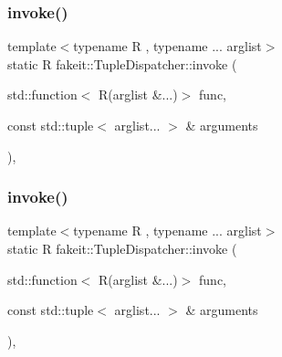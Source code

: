 \subsubsection{\texorpdfstring{invoke()}{invoke()}\hspace{0.1cm}{\footnotesize\ttfamily [7/9]}}
{\footnotesize\ttfamily template$<$typename R , typename ... arglist$>$ \\
static R fakeit\+::\+Tuple\+Dispatcher\+::invoke (\begin{DoxyParamCaption}\item[{std\+::function$<$ R(arglist \&...)$>$}]{func,  }\item[{const std\+::tuple$<$ arglist... $>$ \&}]{arguments }\end{DoxyParamCaption})\hspace{0.3cm}{\ttfamily [inline]}, {\ttfamily [static]}}

\mbox{\label{structfakeit_1_1TupleDispatcher_a279619fd6d6649c4d99c459a3286469a}} 
\subsubsection{\texorpdfstring{invoke()}{invoke()}\hspace{0.1cm}{\footnotesize\ttfamily [8/9]}}
{\footnotesize\ttfamily template$<$typename R , typename ... arglist$>$ \\
static R fakeit\+::\+Tuple\+Dispatcher\+::invoke (\begin{DoxyParamCaption}\item[{std\+::function$<$ R(arglist \&...)$>$}]{func,  }\item[{const std\+::tuple$<$ arglist... $>$ \&}]{arguments }\end{DoxyParamCaption})\hspace{0.3cm}{\ttfamily [inline]}, {\ttfamily [static]}}

\mbox{\label{structfakeit_1_1TupleDispatcher_a279619fd6d6649c4d99c459a3286469a}} 
